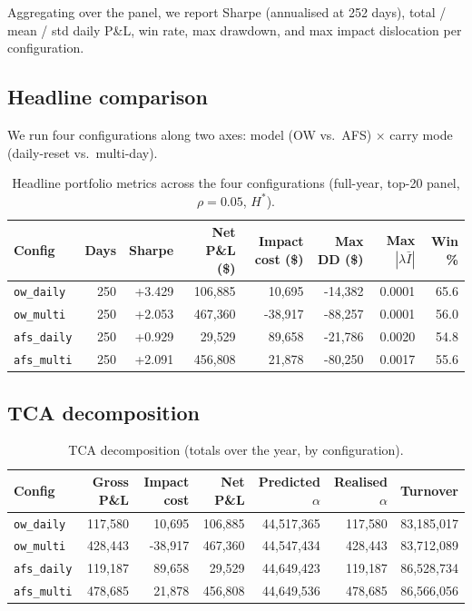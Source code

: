 \documentclass[11pt,a4paper]{article}
\begin{document}
Aggregating over the panel, we report Sharpe (annualised at 252 days),
total / mean / std daily P\&L, win rate, max drawdown, and max impact
dislocation per configuration.

\subsection{Headline comparison}

We run four configurations along two axes: model
(OW vs.\ AFS) $\times$ carry mode (daily-reset vs.\ multi-day).

\begin{table}[H]
\centering\small
\caption{Headline portfolio metrics across the four configurations
         (full-year, top-20 panel, $\rho=0.05$, $H^*$).}
\label{tab:headline}
\begin{tabular}{lrrrrrrr}
\toprule
Config & Days & Sharpe & Net P\&L (\$) & Impact cost (\$) & Max DD (\$) & Max $|\lambda\bar I|$ & Win \% \\
\midrule
\texttt{ow\_daily} & 250 & +3.429 & 106{,}885 & 10{,}695 & -14{,}382 & 0.0001 & 65.6 \\
\texttt{ow\_multi} & 250 & +2.053 & 467{,}360 & -38{,}917 & -88{,}257 & 0.0001 & 56.0 \\
\texttt{afs\_daily} & 250 & +0.929 & 29{,}529 & 89{,}658 & -21{,}786 & 0.0020 & 54.8 \\
\texttt{afs\_multi} & 250 & +2.091 & 456{,}808 & 21{,}878 & -80{,}250 & 0.0017 & 55.6 \\
\bottomrule
\end{tabular}
\end{table}

\subsection{TCA decomposition}

\begin{table}[H]
\centering\small
\caption{TCA decomposition (totals over the year, by configuration).}
\label{tab:tca}
\begin{tabular}{lrrrrrr}
\toprule
Config & Gross P\&L & Impact cost & Net P\&L & Predicted $\alpha$ & Realised $\alpha$ & Turnover \\
\midrule
\texttt{ow\_daily} & 117{,}580 & 10{,}695 & 106{,}885 & 44{,}517{,}365 & 117{,}580 & 83{,}185{,}017 \\
\texttt{ow\_multi} & 428{,}443 & -38{,}917 & 467{,}360 & 44{,}547{,}434 & 428{,}443 & 83{,}712{,}089 \\
\texttt{afs\_daily} & 119{,}187 & 89{,}658 & 29{,}529 & 44{,}649{,}423 & 119{,}187 & 86{,}528{,}734 \\
\texttt{afs\_multi} & 478{,}685 & 21{,}878 & 456{,}808 & 44{,}649{,}536 & 478{,}685 & 86{,}566{,}056 \\
\bottomrule
\end{tabular}
\end{table}
\end{document}
